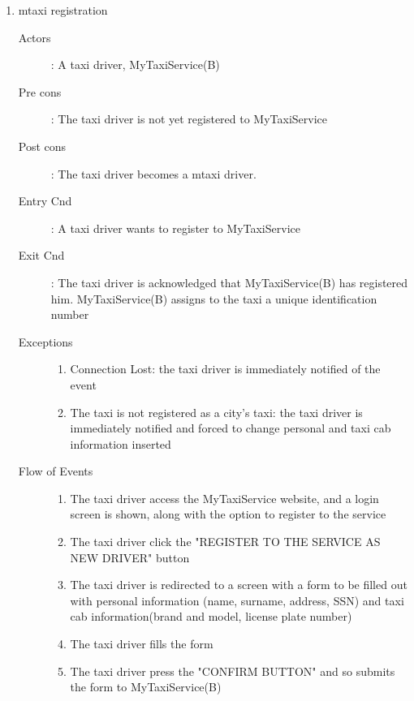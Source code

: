 \documentclass[11pt]{article} %
\begin{document}
\begin{enumerate}
	
	      \item mtaxi registration
		\begin{description}
		        \item [Actors]: A taxi driver, MyTaxiService(B)
		        \item [Pre cons]: The taxi driver is not yet registered to MyTaxiService
		        \item [Post cons]: The taxi driver becomes a mtaxi driver.
		        \item [Entry Cnd]: A taxi driver wants to register to MyTaxiService
		        \item [Exit Cnd]: The taxi driver is acknowledged that MyTaxiService(B) has registered him. MyTaxiService(B)
		        assigns to the taxi a unique identification number
		        \item [Exceptions] \hfill
			\begin{enumerate}
			          \item Connection Lost: the taxi driver is immediately notified of the event
			          \item The taxi is not registered as a city's taxi: the taxi driver is immediately notified
			          and forced to change personal and taxi cab information inserted
			\end{enumerate}
		        \item [Flow of Events]\hfill
			\begin{enumerate}
			          \item The taxi driver access the MyTaxiService website, and a login
			            screen is shown, along with the option to register to the service
			          \item The taxi driver click the "REGISTER TO THE SERVICE AS NEW DRIVER" button
			          \item The taxi driver is redirected to a screen with a form to be filled out with personal information (name, surname, address, SSN) and
			           taxi cab information(brand and model, license plate number)
			          \item The taxi driver fills the form
			          \item The taxi driver press the "CONFIRM BUTTON" and so submits the form to MyTaxiService(B)
			\end{enumerate}
		\end{description}

	\end{enumerate}
\end{document}
